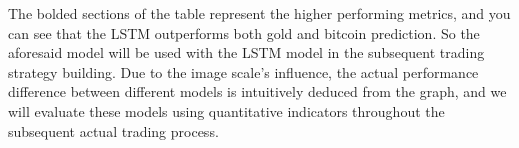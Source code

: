 \documentclass{mcmthesis}
\begin{document}
The bolded sections of the table represent the higher performing metrics, and you can see that the LSTM outperforms both gold and bitcoin prediction. So the aforesaid model will be used with the LSTM model in the subsequent trading strategy building. Due to the image scale's influence, the actual performance difference between different models is intuitively deduced from the graph, and we will evaluate these models using quantitative indicators throughout the subsequent actual trading process.

\end{document}
